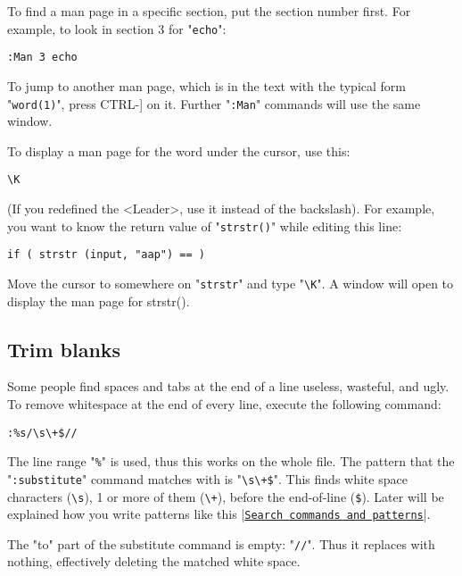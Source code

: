 To find a man page in a specific section, put the section number first.
For example, to look in section 3 for "\texttt{echo}":

\begin{Verbatim}[samepage=true]
 :Man 3 echo
\end{Verbatim}

To jump to another man page, which is in the text with the typical form "\texttt{word(1)}", press CTRL-] on it.
Further "\texttt{:Man}" commands will use the same window.

To display a man page for the word under the cursor, use this:

\begin{Verbatim}[samepage=true]
 \K
\end{Verbatim}

(If you redefined the <Leader>, use it instead of the backslash).
For example, you want to know the return value of "\texttt{strstr()}" while editing
this line:

\begin{Verbatim}[samepage=true]
    if ( strstr (input, "aap") == ) 
\end{Verbatim}

Move the cursor to somewhere on "\texttt{strstr}" and type "\texttt{\textbackslash{}K}".
A window will open to display the man page for strstr().
\subsection{Trim blanks}
Some people find spaces and tabs at the end of a line useless, wasteful, and ugly.
To remove whitespace at the end of every line, execute the following command:

\begin{Verbatim}[samepage=true]
 :%s/\s\+$//
\end{Verbatim}

The line range "\texttt{\%}" is used, thus this works on the whole file.
The pattern that the "\texttt{:substitute}" command matches with is "\texttt{\textbackslash{}s\textbackslash{}+\$}".
This finds white space characters (\texttt{\textbackslash{}s}), 1 or more of them (\texttt{\textbackslash{}+}), before the end-of-line (\texttt{\$}).
Later will be explained how you write patterns like this |\hyperref[Search commands and patterns]{\texttt{Search commands and patterns}}|.

The "to" part of the substitute command is empty: "\texttt{//}".
Thus it replaces with nothing, effectively deleting the matched white space.

